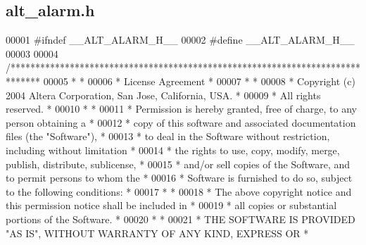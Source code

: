 \subsection{alt\+\_\+alarm.\+h}
\label{sys_2alt__alarm_8h_source}

\begin{DoxyCode}
00001 \textcolor{preprocessor}{#ifndef \_\_ALT\_ALARM\_H\_\_}
00002 \textcolor{preprocessor}{#define \_\_ALT\_ALARM\_H\_\_}
00003 
00004 \textcolor{comment}{/******************************************************************************}
00005 \textcolor{comment}{*                                                                             *}
00006 \textcolor{comment}{* License Agreement                                                           *}
00007 \textcolor{comment}{*                                                                             *}
00008 \textcolor{comment}{* Copyright (c) 2004 Altera Corporation, San Jose, California, USA.           *}
00009 \textcolor{comment}{* All rights reserved.                                                        *}
00010 \textcolor{comment}{*                                                                             *}
00011 \textcolor{comment}{* Permission is hereby granted, free of charge, to any person obtaining a     *}
00012 \textcolor{comment}{* copy of this software and associated documentation files (the "Software"),  *}
00013 \textcolor{comment}{* to deal in the Software without restriction, including without limitation   *}
00014 \textcolor{comment}{* the rights to use, copy, modify, merge, publish, distribute, sublicense,    *}
00015 \textcolor{comment}{* and/or sell copies of the Software, and to permit persons to whom the       *}
00016 \textcolor{comment}{* Software is furnished to do so, subject to the following conditions:        *}
00017 \textcolor{comment}{*                                                                             *}
00018 \textcolor{comment}{* The above copyright notice and this permission notice shall be included in  *}
00019 \textcolor{comment}{* all copies or substantial portions of the Software.                         *}
00020 \textcolor{comment}{*                                                                             *}
00021 \textcolor{comment}{* THE SOFTWARE IS PROVIDED "AS IS", WITHOUT WARRANTY OF ANY KIND, EXPRESS OR  *}

\end{DoxyCode}
